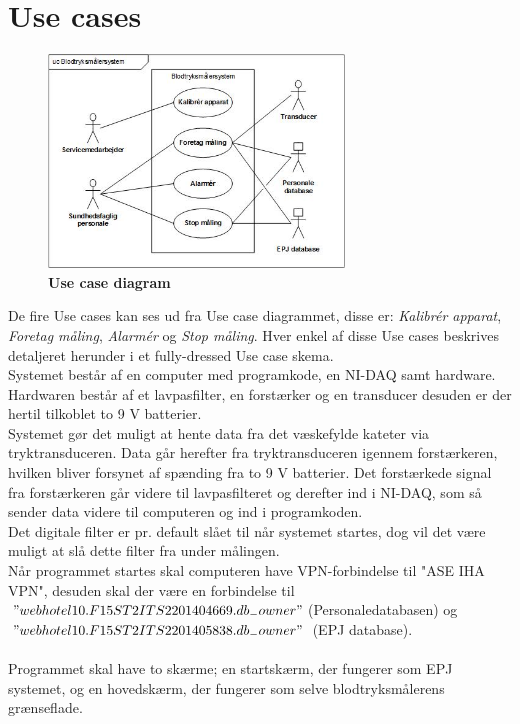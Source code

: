 \section{Use cases}
\begin{figure}[H]
\includegraphics[width =0.7\textwidth , center]{billeder/UseCaseDiagram}
\caption{\textbf{Use case diagram}}
\end{figure}
De fire Use cases kan ses ud fra Use case diagrammet, disse er: \textit{Kalibrér apparat}, \textit{Foretag måling}, \textit{Alarmér} og \textit{Stop måling}. Hver enkel af disse Use cases beskrives detaljeret herunder i et fully-dressed Use case skema.\\
Systemet består af en computer med programkode, en NI-DAQ samt hardware. Hardwaren består af et lavpasfilter, en forstærker og en transducer desuden er der hertil tilkoblet to 9 V batterier.
\\
Systemet gør det muligt at hente data fra det væskefylde kateter via tryktransduceren. Data går herefter fra tryktransduceren igennem forstærkeren, hvilken bliver forsynet af spænding fra to 9 V batterier. Det forstærkede signal fra forstærkeren går videre til lavpasfilteret og derefter ind i NI-DAQ, som så sender data videre til computeren og ind i programkoden. 
\\ 
Det digitale filter er pr. default slået til når systemet startes, dog vil det være muligt at slå dette filter fra under målingen.\\
Når programmet startes skal computeren have VPN-forbindelse til "ASE IHA VPN", desuden skal der være en forbindelse til $"webhotel10.F15ST2ITS2201404669.db_{-}owner"$(Personaledatabasen) og $"webhotel10.F15ST2ITS2201405838.db_{-}owner"$ (EPJ database).\\\\
Programmet skal have to skærme; en startskærm, der fungerer som EPJ systemet, og en hovedskærm, der fungerer som selve blodtryksmålerens grænseflade.

